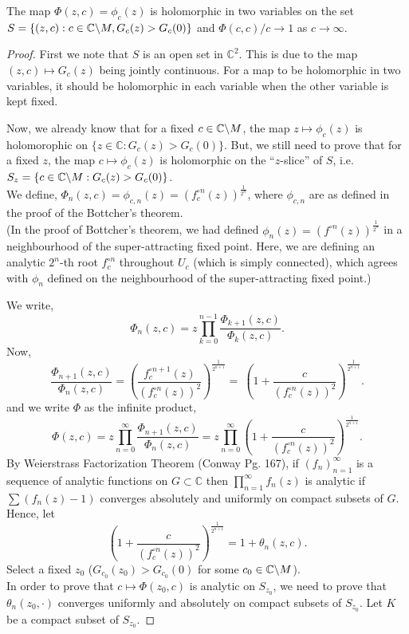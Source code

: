 \begin{lemma}
	The map \( \Phi(z,c)= \phi_c(z) \) is holomorphic in 
	two variables on the set \( S=\{(z,c): c\in \mathbb{C}\backslash M, G_c(z)>G_c(0)\} \)
	and \( \Phi(c,c) /c \to 1 \) as \( c\to \infty \).
\end{lemma}
\begin{proof}
	First we note that \( S \) is an open set in \( \mathbb{C}^2 \). This is due to the map
	\( (z,c)\mapsto G_c(z) \) being jointly continuous.
	For a map to be holomorphic in two variables, it should be holomorphic in each variable
	when the other variable is kept fixed.

Now, we already know that for a fixed \( c\in \mathbb{C}\backslash M  \), the map \( z\mapsto \phi_c(z) \)
is holomorophic on \( \{z\in \mathbb{C}:G_c(z)>G_c(0)\} \).
But, we still need to prove that for a fixed \( z \), the map \( c\mapsto \phi_c(z) \)
is holomorphic on the ``\( z \)-slice'' of \( S \), i.e. \( S_{z}=\{c\in \mathbb{C}\backslash M:G_c(z)>G_c(0)\} \).\\
We define, \( \Phi_n(z,c)=\phi_{c,n}(z)=(f_c^{\circ n}(z))^{\frac{1}{2^n}} \), where \( \phi_{c,n} \)
are as defined in the proof of the Bottcher's theorem.\\
(In the proof of Bottcher's theorem, we had defined
\( \phi_n(z)=(f^{\circ n}(z))^{\frac{1}{2^n}} \) in a neighbourhood of the super-attracting fixed point. Here, we are defining an 
analytic \( 2^n \)-th root \( f_c^{\circ n} \) throughout \( U_c \) (which is simply connected), which agrees with \( \phi_n \)
defined on the neighbourhood of the super-attracting fixed point.)

\noindent We write, \[
\Phi_n(z,c)=z\prod_{k=0}^{n-1} \frac{\Phi_{k+1}(z,c)}{\Phi_k(z,c)}
.\]
Now, \[
	\frac{\Phi_{n+1}(z,c)}{\Phi_n(z,c)}=\left(\frac{f_c^{\circ n+1}(z)}{(f_c^{\circ n}(z))^2}\right)^{\frac{1}{2^{n+1}}}=\
\left(1+\frac{c}{(f_c^{\circ n}(z))^2}\right)^{\frac{1}{2^{n+1}}}
.\] 
and we write \( \Phi \) as the infinite product, \[
\Phi(z,c)=z\prod_{n=0}^{\infty} \frac{\Phi_{n+1}(z,c)}{\Phi_n(z,c)} =z \prod_{n=0}^{\infty} \left(1+\frac{c}{(f_c^{\circ n}(z))^2}\right)^{\frac{1}{2^{n+1}}}
.\] 
By Weierstrass Factorization Theorem (Conway Pg. 167), if \( (f_n)_{n=1}^{\infty} \) is a sequence of analytic functions on \( G \subset \mathbb{C} \)
then \( \prod_{n=1}^{\infty} f_n(z)  \) is analytic
if \( \sum(f_n(z)-1) \) converges absolutely and uniformly on compact subsets of \( G \).
Hence, let \[
	\left(1+\frac{c}{(f_c^{\circ n}(z))^2}\right)^{\frac{1}{2^{n+1}}}=1+\theta_n(z,c)
.\]
Select a fixed \( z_0 \) (\( G_{c_0}(z_0)>G_{c_0}(0) \) for some \( c_0  \in  \mathbb{C}\backslash M\)).\\
In order to prove that \( c\mapsto \Phi(z_0,c) \) is analytic on \( S_{z_0} \), 
we need to prove that \( \theta_n(z_0,\cdot) \) converges uniformly and absolutely on compact subsets of \( S_{z_0} \).
Let \( K \) be a compact subset of \( S_{z_0} \).


\end{proof}
